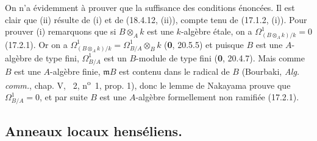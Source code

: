 On n'a évidemment à prouver que la suffisance des conditions énoncées. Il est clair que (ii) résulte de (i) et de (18.4.12, (ii)), compte tenu de (17.1.2, (i)). Pour prouver (i) remarquons que si $B\otimes_A k$ est une $k$-algèbre étale, on a $\Omega^1_{(B\otimes_A k)/k}=0$ (17.2.1). Or on a $\Omega^1_{(B\otimes_A k)/k}=\Omega^1_{B/A}\otimes_B k$ (\textbf{0}, 20.5.5) et puisque $B$ est une $A$-algèbre de type fini, $\Omega^1_{B/A}$ est un $B$-module de type fini (\textbf{0}, 20.4.7). Mais comme $B$ est une $A$-algèbre finie, $\mathfrak mB$ est contenu dans le radical de $B$ (Bourbaki, \emph{Alg. comm.}, chap. V, \textsection~2, n\textsuperscript{o}~1, prop. 1), donc le lemme de Nakayama prouve que $\Omega^1_{B/A}=0$, et par suite $B$ est une $A$-algèbre formellement non ramifiée (17.2.1).

\subsection{Anneaux locaux henséliens\texorpdfstring{\protect\footnotemark}{}.}

